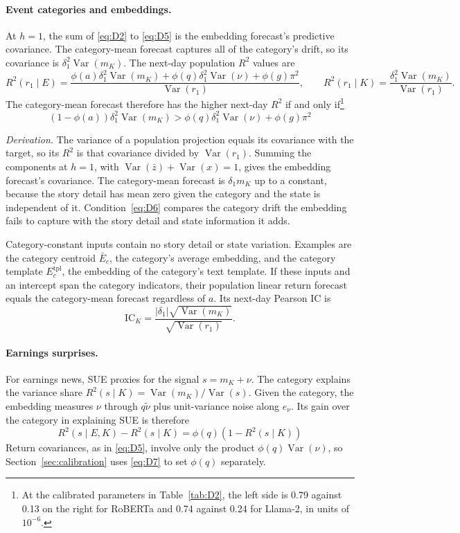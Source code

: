\documentclass[11pt,letterpaper]{article}
\theoremstyle{remark}
\DeclareMathOperator{\Var}{Var}
\begin{document}
\paragraph{Event categories and embeddings.}
At $h=1$, the sum of \eqref{eq:D2} to \eqref{eq:D5} is the embedding forecast's predictive covariance. The category-mean forecast captures all of the category's drift, so its covariance is $\delta_1^2\Var(m_K)$. The next-day population $R^2$ values are
\[
R^2(r_1\mid E)
=\frac{\phi(a)\delta_1^2\Var(m_K)+\phi(q)\delta_1^2\Var(\nu)+\phi(g)\pi^2}{\Var(r_1)},
\qquad
R^2(r_1\mid K)=\frac{\delta_1^2\Var(m_K)}{\Var(r_1)}.
\]
The category-mean forecast therefore has the higher next-day $R^2$ if and only if\footnote{At the calibrated parameters in Table~\ref{tab:D2}, the left side is 0.79 against 0.13 on the right for RoBERTa and 0.74 against 0.24 for Llama-2, in units of $10^{-6}$.}
\begin{equation}\label{eq:D6}
\left(1-\phi(a)\right)\delta_1^2\Var(m_K)
>\phi(q)\delta_1^2\Var(\nu)+\phi(g)\pi^2
\end{equation}

\emph{Derivation.}
The variance of a population projection equals its covariance with the target, so its $R^2$ is that covariance divided by $\Var(r_1)$. Summing the components at $h=1$, with $\Var(\bar z)+\Var(x)=1$, gives the embedding forecast's covariance. The category-mean forecast is $\delta_1m_K$ up to a constant, because the story detail has mean zero given the category and the state is independent of it. Condition~\eqref{eq:D6} compares the category drift the embedding fails to capture with the story detail and state information it adds.

Category-constant inputs contain no story detail or state variation. Examples are the category centroid $\bar E_c$, the category's average embedding, and the category template $E^{\mathrm{tpl}}_c$, the embedding of the category's text template. If these inputs and an intercept span the category indicators, their population linear return forecast equals the category-mean forecast regardless of $a$. Its next-day Pearson IC is
\[
\mathrm{IC}_K=\frac{|\delta_1|\sqrt{\Var(m_K)}}{\sqrt{\Var(r_1)}}.
\]

\paragraph{Earnings surprises.}
For earnings news, SUE proxies for the signal $s=m_K+\nu$. The category explains the variance share $R^2(s\mid K)=\Var(m_K)/\Var(s)$. Given the category, the embedding measures $\nu$ through $q\tilde\nu$ plus unit-variance noise along $e_\nu$. Its gain over the category in explaining SUE is therefore
\begin{equation}\label{eq:D7}
R^2(s\mid E,K)-R^2(s\mid K)
=\phi(q)\left(1-R^2(s\mid K)\right)
\end{equation}
Return covariances, as in \eqref{eq:D5}, involve only the product $\phi(q)\Var(\nu)$, so Section~\ref{sec:calibration} uses \eqref{eq:D7} to set $\phi(q)$ separately.
\end{document}
